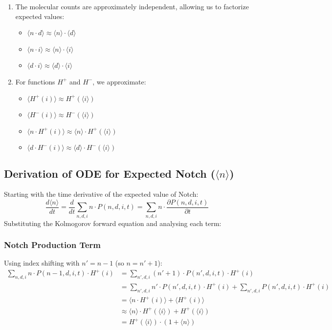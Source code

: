 \documentclass{article}
\begin{document}
\begin{flushleft}
\begin{enumerate}
  \item The molecular counts are approximately independent, allowing us to factorize expected values:
  \begin{itemize}
    \item $\langle n \cdot d \rangle \approx \langle n \rangle \cdot \langle d \rangle$
    \item $\langle n \cdot i \rangle \approx \langle n \rangle \cdot \langle i \rangle$
    \item $\langle d \cdot i \rangle \approx \langle d \rangle \cdot \langle i \rangle$
  \end{itemize}
  
  \item For functions $H^+$ and $H^-$, we approximate:
  \begin{itemize}
    \item $\langle H^+(i) \rangle \approx H^+(\langle i \rangle)$
    \item $\langle H^-(i) \rangle \approx H^-(\langle i \rangle)$
    \item $\langle n \cdot H^+(i) \rangle \approx \langle n \rangle \cdot H^+(\langle i \rangle)$
    \item $\langle d \cdot H^-(i) \rangle \approx \langle d \rangle \cdot H^-(\langle i \rangle)$
  \end{itemize}
\end{enumerate}

\subsection*{Derivation of ODE for Expected Notch ($\langle n \rangle$)}

Starting with the time derivative of the expected value of Notch:
$$\frac{d\langle n \rangle}{dt} = \frac{d}{dt}\sum_{n,d,i} n \cdot P(n,d,i,t) = \sum_{n,d,i} n \cdot \frac{\partial P(n,d,i,t)}{\partial t}$$
Substituting the Kolmogorov forward equation and analysing each term:

\subsubsection*{Notch Production Term}
Using index shifting with $n' = n-1$ (so $n = n'+1$):
\begin{align*}
\sum_{n,d,i} n \cdot P(n-1,d,i,t) \cdot H^+(i) &= \sum_{n',d,i} (n'+1) \cdot P(n',d,i,t) \cdot H^+(i) \\
&= \sum_{n',d,i} n' \cdot P(n',d,i,t) \cdot H^+(i) + \sum_{n',d,i} P(n',d,i,t) \cdot H^+(i) \\
&= \langle n \cdot H^+(i) \rangle + \langle H^+(i) \rangle \\
&\approx \langle n \rangle \cdot H^+(\langle i \rangle) + H^+(\langle i \rangle) \\
&= H^+(\langle i \rangle) \cdot (1 + \langle n \rangle)
\end{align*}


\end{flushleft}
\end{document}

